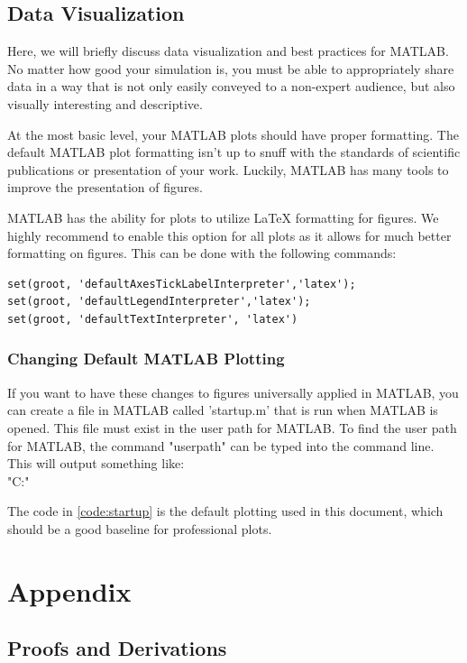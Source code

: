 \documentclass[12pt]{report}
\begin{document}
\section{Data Visualization}
Here, we will briefly discuss data visualization and best practices for MATLAB. No matter how good your simulation is, you must be able to appropriately share data in a way that is not only easily conveyed to a non-expert audience, but also visually interesting and descriptive.

At the most basic level, your MATLAB plots should have proper formatting. The default MATLAB plot formatting isn't up to snuff with the standards of scientific publications or presentation of your work. Luckily, MATLAB has many tools to improve the presentation of figures.

MATLAB has the ability for plots to utilize LaTeX formatting for figures. We highly recommend to enable this option for all plots as it allows for much better formatting on figures. This can be done with the following commands:
\begin{lstlisting}[style=Matlab-editor]
set(groot, 'defaultAxesTickLabelInterpreter','latex');
set(groot, 'defaultLegendInterpreter','latex');
set(groot, 'defaultTextInterpreter', 'latex')
\end{lstlisting}
\subsection{Changing Default MATLAB Plotting}
If you want to have these changes to figures universally applied in MATLAB, you can create a file in MATLAB called 'startup.m' that is run when MATLAB is opened. This file must exist in the user path for MATLAB. To find the user path for MATLAB, the command "userpath" can be typed into the command line. This will output something like:
\\
"C:\Users\YourName\OneDrive\Documents\MATLAB"

The code in \ref{code:startup} is the default plotting used in this document, which should be a good baseline for professional plots.
\label{code:startup}

\chapter{Appendix}

\section{Proofs and Derivations}\label{sec:ProofsAndDerivations}
\end{document}
